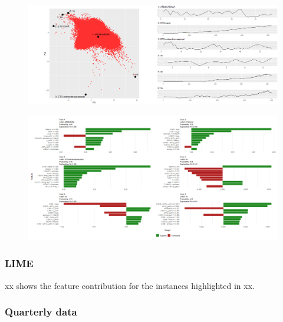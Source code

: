 \documentclass[11pt,a4paper,]{article}
\theoremstyle{definition}
\theoremstyle{definition}
\theoremstyle{definition}
\theoremstyle{remark}
\begin{document}
\begin{figure}[h]

{\centering \includegraphics{figures/yearly_lime-1} 

}

\end{figure}\begin{figure}[h]

{\centering \includegraphics{figures/yearly_lime-2} 

}

\end{figure}

\subsubsection{LIME}\label{lime}

xx shows the feature contribution for the instances highlighted in xx.

\newpage

\subsubsection{Quarterly data}\label{quarterly-data}
\end{document}

